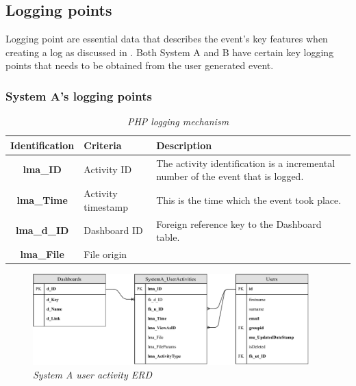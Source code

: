 \subsection{Logging points}
Logging point are essential data that describes the event's key features when creating a log as discussed in . Both System A and B have certain key logging points that needs to be obtained from the user generated event.

\subsubsection{System A's logging points}

\begin{table}[!htb]
	\centering
	\small
	\caption[Logging points]
	{\textit{PHP logging mechanism}}
	\label{tbl:PHP_LoggignMechanism}
	\begin{tabularx}{\textwidth}{|c|l|X|}
		\hline \textbf{Identification} & \textbf{Criteria} & \textbf{Description} \\
        \hline \textbf{lma\_ID} & Activity ID & The activity identification is a incremental number of the event that is logged.\\
        \hline \textbf{lma\_Time} & Activity timestamp & This is the time which the event took place.\\
		\hline \textbf{lma\_d\_ID} & Dashboard ID & Foreign reference key to the Dashboard table.\\
		\hline \textbf{lma\_File} & File origin & \\
		\hline
	\end{tabularx}
\end{table}

\begin{figure}[!htb] %
	\centering %
	\includegraphics[width=0.95\textwidth]{Images/Chapter2/SystemA_ERD_Basic/SystemA_ERD_Basic.pdf}
	\caption[System A user activity ERD]
	{\textit{System A user activity ERD}}\label{fig:SystemA_Basic_ERD}
\end{figure}

